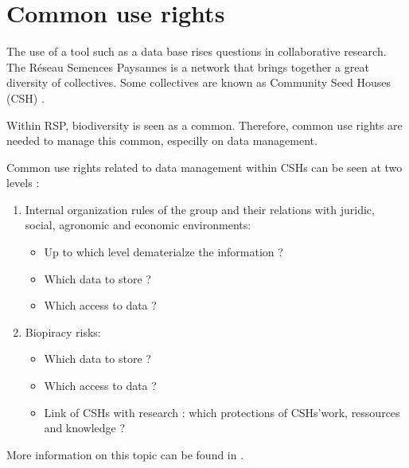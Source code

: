\section{Common use rights}

The use of a tool such as a data base rises questions in collaborative research.
The R\'eseau Semences Paysannes is a network that brings together a great diversity of collectives.
Some collectives are known as Community Seed Houses (CSH) \citep{rsp_msp_2014}.

Within RSP, biodiversity is seen as a common.
Therefore, common use rights are needed to manage this common, especilly on data management.

Common use rights related to data management within CSHs can be seen at two levels :

\begin{enumerate}

\item Internal organization rules of the group and their relations with juridic, social, agronomic and economic environments:
	\begin{itemize}
	\item Up to which level dematerialze the information ?
	\item Which data to store ?
	\item Which access to data ?
	\end{itemize}

\item Biopiracy risks:
	\begin{itemize}
	\item Which data to store ?
	\item Which access to data ?
	\item Link of CSHs with research : which protections of CSHs'work, ressources and knowledge ?
	\end{itemize}

\end{enumerate}

More information on this topic can be found in \citet{rsp_element_2015}.



